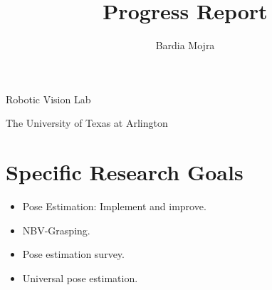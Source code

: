 \documentclass[11pt]{article}
\title{Progress Report}
\author{Bardia Mojra}
\begin{document}
\maketitle
\thispagestyle{empty}

\bigskip
\bigskip
\begin{center}
      Robotic Vision Lab
\end{center}

\begin{center}
      The University of Texas at Arlington
\end{center}

\newpage

\section{Specific Research Goals}
\begin{itemize}
      \item Pose Estimation: Implement and improve.
      \item NBV-Grasping.
      \item Pose estimation survey.
      \item Universal pose estimation.
\end{itemize}
\end{document}
